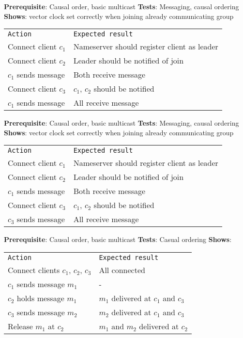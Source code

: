 
	\textbf{Prerequisite}: Causal order, basic multicast
	\textbf{Tests}: Messaging, causal ordering
	\textbf{Shows}: vector clock set correctly when joining already communicating group

	\begin{tabular}{ll}
		\texttt{Action} & \texttt{Expected result} \\
		Connect client $c_1$ & Nameserver should register client as leader \\
		Connect client $c_2$ & Leader should be notified of join \\
		$c_1$ sends message & Both receive message \\
		Connect client $c_3$ & $c_1$, $c_2$ should be notified \\
		$c_1$ sends message & All receive message \\
	\end{tabular}

	\textbf{Prerequisite}: Causal order, basic multicast
	\textbf{Tests}: Messaging, causal ordering
	\textbf{Shows}: vector clock set correctly when joining already communicating group
	\begin{tabular}{ll}
		\texttt{Action} & \texttt{Expected result} \\
		Connect client $c_1$ & Nameserver should register client as leader \\
		Connect client $c_2$ & Leader should be notified of join \\
		$c_1$ sends message & Both receive message \\
		Connect client $c_3$ & $c_1$, $c_2$ should be notified \\
		$c_3$ sends message & All receive message \\
	\end{tabular}


	\textbf{Prerequisite}: Causal order, basic multicast
	\textbf{Tests}: Casual ordering
	\textbf{Shows}: 

	\begin{tabular}{ll}
		\texttt{Action} & \texttt{Expected result} \\
		Connect clients $c_1$, $c_2$, $c_3$ & All connected\\
		$c_1$ sends message $m_1$ & -\\
		$c_2$ holds message $m_1$ & $m_1$ delivered at $c_1$ and $c_3$ \\
		$c_3$ sends message $m_2$ & $m_2$ delivered at $c_1$ and $c_3$ \\
		Release $m_1$ at $c_2$ & $m_1$ and $m_2$ delivered at $c_2$ \\
	\end{tabular}

